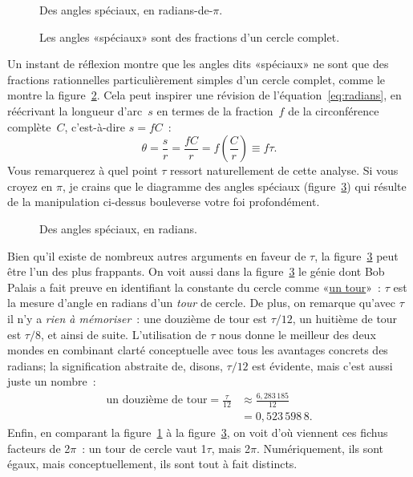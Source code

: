 \begin{figure}
\begin{center}
\end{center}
\caption{Des angles spéciaux, en radians-de-$\pi$.\label{fig:pi_angles}}
\end{figure}

\begin{figure}
\begin{center}
\end{center}
\caption{Les angles «\ns spéciaux\ns » sont des fractions d'un cercle
complet.\label{fig:angle_fractions}}
\end{figure}

Un instant de réflexion montre que les angles dits «\ns spéciaux\ns » ne sont que
des fractions rationnelles particulièrement simples d'un cercle complet, comme
le montre la figure~\ref{fig:angle_fractions}. Cela peut inspirer une révision de
l'équation~\eqref{eq:radians}, en réécrivant la longueur d'arc~$s$ en termes de
la fraction~$f$ de la circonférence complète~$C$, c'est-à-dire $s = f C$~:
\[ \theta = \frac{s}{r} = \frac{fC}{r} =  f\left(\frac{C}{r}\right) \equiv f\tau. \]
Vous remarquerez à quel point $\tau$ ressort naturellement de cette analyse. Si vous croyez en
$\pi$, je crains que le diagramme des angles spéciaux (figure~\ref{fig:tau_angles})
qui résulte de la manipulation ci-dessus bouleverse votre foi profondément.

\begin{figure}
\begin{center}
\end{center}
\caption{Des angles spéciaux, en radians.\label{fig:tau_angles}}
\end{figure}

Bien qu'il existe de nombreux autres arguments en faveur de $\tau$, la
figure~\ref{fig:tau_angles} peut être l'un des plus frappants. On voit
aussi dans la figure~\ref{fig:tau_angles} le génie dont Bob Palais
a fait preuve en identifiant la constante du cercle comme
«\ns \href{https://fr.wikipedia.org/wiki/Tour_(angle)}{un tour}\ns »~: $\tau$ est la
mesure d'angle en radians d'un \emph{tour} de cercle. De plus, on remarque
qu'avec $\tau$ il n'y a \emph{rien à mémoriser}~: une douzième de tour est
$\tau/12$, un huitième de tour est $\tau/8$, et ainsi de suite. L'utilisation de
$\tau$ nous donne le meilleur des deux mondes en combinant clarté conceptuelle
avec tous les avantages concrets des radians\ns; la signification abstraite de,
disons, $\tau/12$ est évidente, mais c'est aussi juste un nombre~:
\[
\begin{split}
\mbox{un douzième de tour} = \frac{\tau}{12} & \approx \frac{6{,}283\,185}{12} \\
                                             & = 0{,}523\,598\,8.
\end{split}
\]
Enfin, en comparant la figure~\ref{fig:pi_angles} à la
figure~\ref{fig:tau_angles}, on voit d'où viennent ces fichus facteurs de
2$\pi$~: un tour de cercle vaut 1$\tau$, mais 2$\pi$. Numériquement, ils sont
égaux, mais conceptuellement, ils sont tout à fait distincts.

